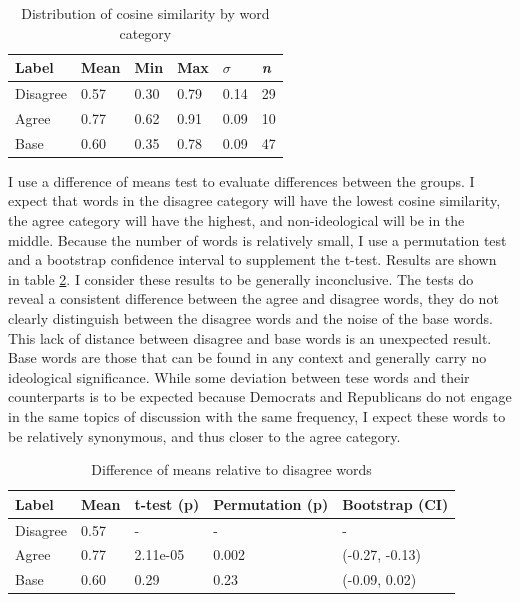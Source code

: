 \documentclass[../embeddings.tex]{subfiles}
\begin{document}
\begin{table}[h]
    \caption{Distribution of cosine similarity by word category}
    \begin{tabular}{llllll}
      \toprule
      Label    & Mean & Min  & Max  & $\sigma$ & \textit{n}\\
      \midrule
      Disagree & 0.57 & 0.30 & 0.79 & 0.14   & 29\\
      Agree    & 0.77 & 0.62 & 0.91 & 0.09   & 10\\
      Base     & 0.60 & 0.35 & 0.78 & 0.09   & 47\\
      \bottomrule
    \end{tabular}
    \label{table:dist}
\end{table}

I use a difference of means test to evaluate differences between the groups. I expect that words in the disagree category will have the lowest cosine similarity, the agree category will have the highest, and non-ideological will be in the middle. Because the number of words is relatively small, I use a permutation test and a bootstrap confidence interval to supplement the t-test. Results are shown in table \ref{table:cs}. I consider these results to be generally inconclusive. The tests do reveal a consistent difference between the agree and disagree words, they do not clearly distinguish between the disagree words and the noise of the base words. This lack of distance between disagree and base words is an unexpected result. Base words are those that can be found in any context and generally carry no ideological significance. While some deviation between tese words and their counterparts is to be expected because Democrats and Republicans do not engage in the same topics of discussion with the same frequency, I expect these words to be relatively synonymous, and thus closer to the agree category. 

\begin{table}[h]
    \caption{Difference of means relative to disagree words}
    \begin{tabular}{lllll}
      \toprule
      Label    & Mean  & t-test (p) & Permutation (p) & Bootstrap (CI)\\
      \midrule
      Disagree & 0.57  & -          & -               & -\\
      Agree    & 0.77  & 2.11e-05   & 0.002           & (-0.27, -0.13)\\
      Base     & 0.60  & 0.29       & 0.23            & (-0.09, 0.02)\\
      \bottomrule
    \end{tabular}
    \label{table:cs}
\end{table}
\end{document}
